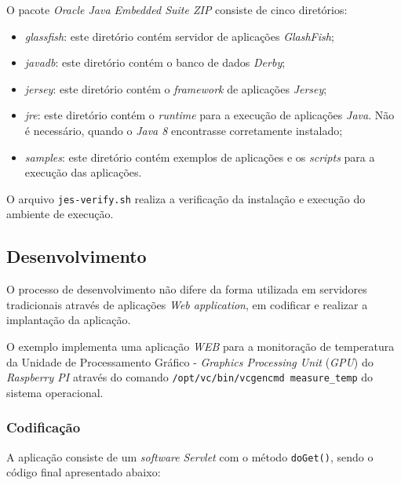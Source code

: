 O pacote \textit{Oracle Java Embedded Suite ZIP} consiste de cinco diretórios:

\begin{itemize}
    
    \item \textit{glassfish}: este diretório contém servidor de aplicações 
    \textit{GlashFish};
    
    \item \textit{javadb}: este diretório contém o banco de dados 
    \textit{Derby};
    
    \item \textit{jersey}: este diretório contém o \textit{framework} de 
    aplicações \textit{Jersey};
    
    \item \textit{jre}: este diretório contém o \textit{runtime} para a 
    execução de aplicações \textit{Java}. Não é necessário, quando o 
    \textit{Java 8} encontrasse corretamente instalado;
    
    \item \textit{samples}: este diretório contém exemplos de aplicações e os 
    \textit{scripts} para a execução das aplicações.
    
\end{itemize}

O arquivo \verb|jes-verify.sh| realiza a verificação da instalação e execução 
do ambiente de execução.

\subsection{Desenvolvimento}

O processo de desenvolvimento não difere da forma utilizada em servidores tradicionais através de aplicações \textit{Web application}, em codificar e realizar a implantação da aplicação.

O exemplo implementa uma aplicação \textit{WEB} para a monitoração de temperatura da Unidade de Processamento Gráfico - \textit{Graphics Processing Unit} (\textit{GPU}) do \textit{Raspberry PI} através do comando \verb|/opt/vc/bin/vcgencmd measure_temp| do sistema operacional.

\subsubsection{Codificação}

A aplicação consiste de um \textit{software} \textit{Servlet} com o método \verb|doGet()|, sendo o código final apresentado abaixo:

